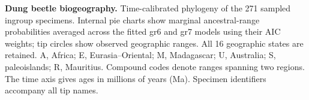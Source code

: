 \noindent\textbf{Dung beetle biogeography.}
Time-calibrated phylogeny of the 271 sampled ingroup specimens.
Internal pie charts show marginal ancestral-range probabilities averaged
across the fitted gr6 and gr7 models using their AIC weights; tip circles
show observed geographic ranges. All 16 geographic states are retained.
A, Africa; E, Eurasia--Oriental; M, Madagascar; U, Australia;
S, paleoislands; R, Mauritius. Compound codes denote ranges spanning
two regions. The time axis gives ages in millions of years (Ma).
Specimen identifiers accompany all tip names.
